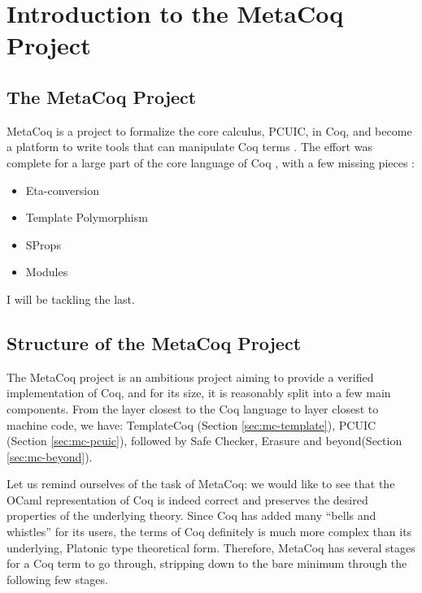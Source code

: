 \chapter{Introduction to the MetaCoq Project}

\section{The MetaCoq Project}
MetaCoq is a project to formalize the core calculus, PCUIC, in Coq, and become a
platform to write tools that can manipulate Coq terms
. The effort was complete for a large part of the
core language of Coq , with a few missing pieces :

\begin{itemize}
    \item Eta-conversion
    \item Template Polymorphism
    \item SProps
    \item Modules
\end{itemize}

I will be tackling the last.

\section{Structure of the MetaCoq Project} The MetaCoq project is an ambitious
project aiming to provide a verified implementation of Coq, and for its size, it
is reasonably split into a few main components. From the layer closest to the
Coq language to layer closest to machine code, we have: TemplateCoq (Section
\ref{sec:mc-template}), PCUIC (Section \ref{sec:mc-pcuic}), followed by Safe
Checker, Erasure and beyond(Section \ref{sec:mc-beyond}).

Let us remind ourselves of the task of MetaCoq: we would like to see that the
OCaml representation of Coq is indeed correct and preserves the desired
properties of the underlying theory. Since Coq has added many ``bells and
whistles'' for its users, the terms of Coq definitely is much more complex than
its underlying, Platonic type theoretical form. Therefore, MetaCoq has several
stages for a Coq term to go through, stripping down to the bare minimum through
the following few stages.

